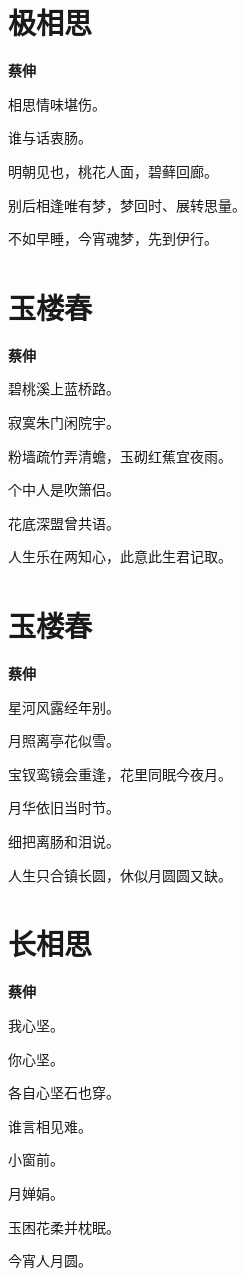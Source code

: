 \documentclass[12pt,a4paper]{ctexbook}
\begin{document}
\section{极相思}
\textbf{蔡伸}\par\vspace{0.5em}
相思情味堪伤。\par
谁与话衷肠。\par
明朝见也，桃花人面，碧藓回廊。\par
别后相逢唯有梦，梦回时、展转思量。\par
不如早睡，今宵魂梦，先到伊行。\par

\section{玉楼春}
\textbf{蔡伸}\par\vspace{0.5em}
碧桃溪上蓝桥路。\par
寂寞朱门闲院宇。\par
粉墙疏竹弄清蟾，玉砌红蕉宜夜雨。\par
个中人是吹箫侣。\par
花底深盟曾共语。\par
人生乐在两知心，此意此生君记取。\par

\section{玉楼春}
\textbf{蔡伸}\par\vspace{0.5em}
星河风露经年别。\par
月照离亭花似雪。\par
宝钗鸾镜会重逢，花里同眠今夜月。\par
月华依旧当时节。\par
细把离肠和泪说。\par
人生只合镇长圆，休似月圆圆又缺。\par

\section{长相思}
\textbf{蔡伸}\par\vspace{0.5em}
我心坚。\par
你心坚。\par
各自心坚石也穿。\par
谁言相见难。\par
小窗前。\par
月婵娟。\par
玉困花柔并枕眠。\par
今宵人月圆。\par
\end{document}
